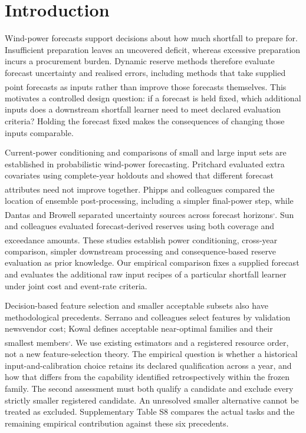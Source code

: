 \documentclass[
  british,
  11pt,
]{article}
\begin{document}
\section{Introduction}\label{introduction}

Wind-power forecasts support decisions about how much shortfall to
prepare for. Insufficient preparation leaves an uncovered deficit,
whereas excessive preparation incurs a procurement burden. Dynamic
reserve methods therefore evaluate forecast uncertainty and realised
errors, including methods that take supplied point forecasts as inputs
rather than improve those forecasts
themselves\textsuperscript{}.
This motivates a controlled design question: if a forecast is held
fixed, which additional inputs does a downstream shortfall learner need
to meet declared evaluation criteria? Holding the forecast fixed makes
the consequences of changing those inputs comparable.

Current-power conditioning and comparisons of small and large input sets
are established in probabilistic wind-power forecasting. Pritchard
evaluated extra covariates using complete-year holdouts and showed that
different forecast attributes need not improve
together\textsuperscript{}.
Phipps and colleagues compared the location of ensemble post-processing,
including a simpler final-power step, while Dantas and Browell separated
uncertainty sources across forecast
horizons\textsuperscript{,}.
Sun and colleagues evaluated forecast-derived reserves using both
coverage and exceedance
amounts\textsuperscript{}. These
studies establish power conditioning, cross-year comparison, simpler
downstream processing and consequence-based reserve evaluation as prior
knowledge. Our empirical comparison fixes a supplied forecast and
evaluates the additional raw input recipes of a particular shortfall
learner under joint cost and event-rate criteria.

Decision-based feature selection and smaller acceptable subsets also
have methodological precedents. Serrano and colleagues select features
by validation newsvendor cost; Kowal defines acceptable near-optimal
families and their smallest
members\textsuperscript{,}.
We use existing estimators and a registered resource order, not a new
feature-selection theory. The empirical question is whether a historical
input-and-calibration choice retains its declared qualification across a
year, and how that differs from the capability identified
retrospectively within the frozen family. The second assessment must
both qualify a candidate and exclude every strictly smaller registered
candidate. An unresolved smaller alternative cannot be treated as
excluded. Supplementary Table S8 compares the actual tasks and the
remaining empirical contribution against these six precedents.
\end{document}
